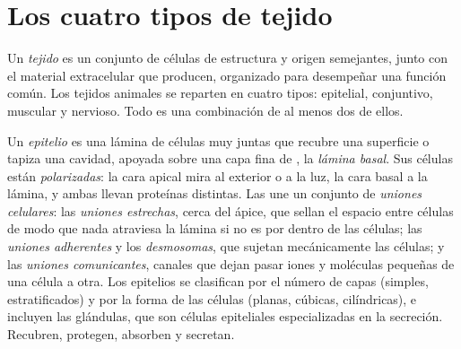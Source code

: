 \section{Los cuatro tipos de tejido}

\begin{definition}[Tejido]\label{def:b1:body-plans-tissues:tissue}
Un \emph{tejido} es un conjunto de células de estructura y
origen semejantes, junto con el material extracelular que producen,
organizado para desempeñar una función común. Los tejidos animales se
reparten en cuatro tipos: epitelial, conjuntivo, muscular y nervioso. Todo
 es una combinación de al menos dos de ellos.
\end{definition}

\begin{definition}\label{def:b1:body-plans-tissues:epithelium}
Un \emph{epitelio} es una lámina de células muy juntas que
recubre una superficie o tapiza una cavidad, apoyada sobre una capa fina de
, la \emph{lámina basal}. Sus células
están \emph{polarizadas}: la cara apical mira al
exterior o a la luz, la cara basal a la lámina, y ambas llevan proteínas
distintas. Las une un conjunto de \emph{uniones
celulares}: las \emph{uniones estrechas}, cerca del
ápice, que sellan el espacio entre células de modo que nada atraviesa la
lámina si no es por dentro de las células; las \emph{uniones adherentes} y
los \emph{desmosomas}, que sujetan mecánicamente las células; y las
\emph{uniones comunicantes}, canales que dejan pasar iones y moléculas
pequeñas de una célula a otra. Los epitelios se clasifican por el número de
capas (simples, estratificados) y por la forma de las células (planas,
cúbicas, cilíndricas), e incluyen las glándulas, que son células
epiteliales especializadas en la secreción. Recubren, protegen, absorben y
secretan.
\end{definition}

